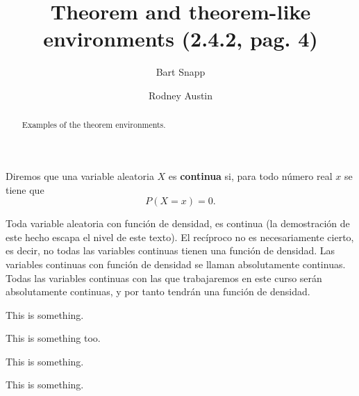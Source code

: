 \documentclass{ximera}
\author{Bart Snapp \and Rodney Austin}
\title[Examples:]{Theorem and theorem-like environments (2.4.2, pag. 4)}
\begin{document}

\begin{abstract}
  Examples of the theorem environments.
\end{abstract}
\maketitle


\lipsum[1]
%
\begin{dfn}
	Diremos que una variable aleatoria $X$ es {\bfseries continua} si, para todo número real $x$ se tiene que 
	\[
		P(X=x)=0.
	\]
\end{dfn}


\lipsum[1]

\begin{thm}[título]
	Toda variable aleatoria con función de densidad, es continua (la demostración de este hecho escapa el nivel de este texto). El recíproco no es necesariamente cierto, es decir, no todas las variables continuas tienen una función de densidad. Las variables continuas con función de densidad se llaman absolutamente continuas. Todas las variables continuas con las que trabajaremos en este curso serán absolutamente continuas, y por tanto tendrán una función de densidad. 
\end{thm}

\lipsum[1]


\begin{prp}
	\lipsum[1]
\end{prp}


\begin{theorem}
  This is something.%
\end{theorem}
%

\begin{theorem}[My theorem]
  This is something too.
\end{theorem}

\begin{algorithm}
  This is something.
\end{algorithm}

\begin{axiom}
  This is something.
\end{axiom}
\end{document}
